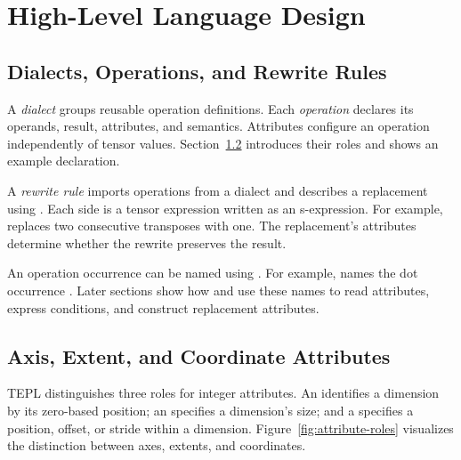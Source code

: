 \section{High-Level Language Design}
\label{sec:language}
\subsection{Dialects, Operations, and Rewrite Rules}
\label{sec:dialects}
A \emph{dialect} groups reusable operation definitions. Each \emph{operation}
declares its operands, result, attributes, and semantics. Attributes configure
an operation independently of tensor values.
Section~\ref{sec:attribute-roles} introduces their roles and shows an example
declaration.

A \emph{rewrite rule} imports operations from a dialect and describes a
replacement using . Each side is a tensor expression written
as an s-expression. For example,
 replaces two consecutive
transposes with one. The replacement's attributes determine whether the
rewrite preserves the result.

An operation occurrence can be named using \code{:}. For example,
 names the dot occurrence . Later sections show
how  and  use these names to read attributes,
express conditions, and construct replacement attributes.


\subsection{Axis, Extent, and Coordinate Attributes}
\label{sec:attribute-roles}

TEPL distinguishes three roles for integer attributes. An 
identifies a dimension by its zero-based position; an 
specifies a dimension's size; and a  specifies a position,
offset, or stride within a dimension. Figure~\ref{fig:attribute-roles} visualizes the distinction between axes,
extents, and coordinates.


